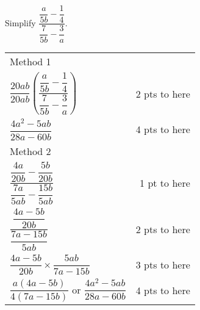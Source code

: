 
{
	Simplify $\displaystyle \dfrac{\dfrac{a}{5b}-\dfrac{1}{4}}{\dfrac{7}{5b}-\dfrac{3}{a}}$.
}
{
	\begin{tabular}{l r}
	Method 1 \\
	$\dfrac{20ab}{20ab}(\dfrac{\dfrac{a}{5b}-\dfrac{1}{4}}{\dfrac{7}{5b}-\dfrac{3}{a}})$& 2 pts to here\\
	$\dfrac{4a^2-5ab}{28a-60b}$ & 4 pts to here\\
	Method 2 \\
	$\dfrac{\dfrac{4a}{20b}-\dfrac{5b}{20b}}{\dfrac{7a}{5ab}-\dfrac{15b}{5ab}}$ & 1 pt to here\\
	$\dfrac{\dfrac{4a-5b}{20b}}{\dfrac{7a-15b}{5ab}}$ & 2 pts to here\\
	$\dfrac{4a-5b}{20b} \times \dfrac{5ab}{7a-15b}$ & 3 pts to here\\
	$\dfrac{a(4a-5b)}{4(7a-15b)}$  or $\dfrac{4a^2-5ab}{28a-60b}$ & 4 pts to here
	\end{tabular}
}

